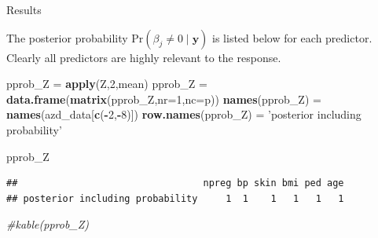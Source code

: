 \documentclass[ignorenonframetext,]{beamer}
\newenvironment{Shaded}{\begin{snugshade}}{\end{snugshade}}
\newcommand{\KeywordTok}[1]{\textcolor[rgb]{0.13,0.29,0.53}{\textbf{#1}}}
\newcommand{\DataTypeTok}[1]{\textcolor[rgb]{0.13,0.29,0.53}{#1}}
\newcommand{\DecValTok}[1]{\textcolor[rgb]{0.00,0.00,0.81}{#1}}
\newcommand{\StringTok}[1]{\textcolor[rgb]{0.31,0.60,0.02}{#1}}
\newcommand{\CommentTok}[1]{\textcolor[rgb]{0.56,0.35,0.01}{\textit{#1}}}
\newcommand{\OperatorTok}[1]{\textcolor[rgb]{0.81,0.36,0.00}{\textbf{#1}}}
\newcommand{\NormalTok}[1]{#1}
\begin{document}
\begin{frame}[fragile]{Results}

The posterior probability
\(\mbox{Pr}(\beta_j \neq 0 \mid \boldsymbol{y})\) is listed below for
each predictor. Clearly all predictors are highly relevant to the
response.

\tiny

\begin{Shaded}
\begin{Highlighting}[]
\NormalTok{pprob_Z =}\StringTok{ }\KeywordTok{apply}\NormalTok{(Z,}\DecValTok{2}\NormalTok{,mean)}
\NormalTok{pprob_Z =}\StringTok{ }\KeywordTok{data.frame}\NormalTok{(}\KeywordTok{matrix}\NormalTok{(pprob_Z,}\DataTypeTok{nr=}\DecValTok{1}\NormalTok{,}\DataTypeTok{nc=}\NormalTok{p))}
\KeywordTok{names}\NormalTok{(pprob_Z) =}\StringTok{ }\KeywordTok{names}\NormalTok{(azd_data[}\KeywordTok{c}\NormalTok{(}\OperatorTok{-}\DecValTok{2}\NormalTok{,}\OperatorTok{-}\DecValTok{8}\NormalTok{)])}
\KeywordTok{row.names}\NormalTok{(pprob_Z) =}\StringTok{ 'posterior including probability'}

\NormalTok{pprob_Z}
\end{Highlighting}
\end{Shaded}

\begin{verbatim}
##                                 npreg bp skin bmi ped age
## posterior including probability     1  1    1   1   1   1
\end{verbatim}

\begin{Shaded}
\begin{Highlighting}[]
\CommentTok{#kable(pprob_Z)}
\end{Highlighting}
\end{Shaded}

\end{frame}
\end{document}
